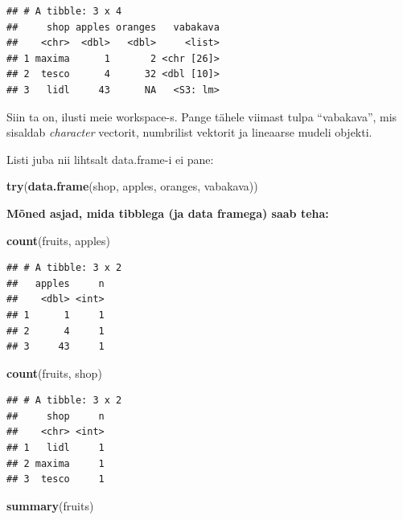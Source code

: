 \documentclass[]{book}
\newenvironment{Shaded}{\begin{snugshade}}{\end{snugshade}}
\newcommand{\KeywordTok}[1]{\textcolor[rgb]{0.13,0.29,0.53}{\textbf{#1}}}
\newcommand{\NormalTok}[1]{#1}
\begin{document}
\begin{verbatim}
## # A tibble: 3 x 4
##     shop apples oranges   vabakava
##    <chr>  <dbl>   <dbl>     <list>
## 1 maxima      1       2 <chr [26]>
## 2  tesco      4      32 <dbl [10]>
## 3   lidl     43      NA   <S3: lm>
\end{verbatim}

Siin ta on, ilusti meie workspace-s. Pange tähele viimast tulpa
``vabakava'', mis sisaldab \emph{character} vectorit, numbrilist
vektorit ja lineaarse mudeli objekti.

Listi juba nii lihtsalt data.frame-i ei pane:

\begin{Shaded}
\begin{Highlighting}[]
\KeywordTok{try}\NormalTok{(}\KeywordTok{data.frame}\NormalTok{(shop, apples, oranges, vabakava))}
\end{Highlighting}
\end{Shaded}

\textbf{Mõned asjad, mida tibblega (ja data framega) saab teha:}

\begin{Shaded}
\begin{Highlighting}[]
\KeywordTok{count}\NormalTok{(fruits, apples)}
\end{Highlighting}
\end{Shaded}

\begin{verbatim}
## # A tibble: 3 x 2
##   apples     n
##    <dbl> <int>
## 1      1     1
## 2      4     1
## 3     43     1
\end{verbatim}

\begin{Shaded}
\begin{Highlighting}[]
\KeywordTok{count}\NormalTok{(fruits, shop)}
\end{Highlighting}
\end{Shaded}

\begin{verbatim}
## # A tibble: 3 x 2
##     shop     n
##    <chr> <int>
## 1   lidl     1
## 2 maxima     1
## 3  tesco     1
\end{verbatim}

\begin{Shaded}
\begin{Highlighting}[]
\KeywordTok{summary}\NormalTok{(fruits)}
\end{Highlighting}
\end{Shaded}
\end{document}

